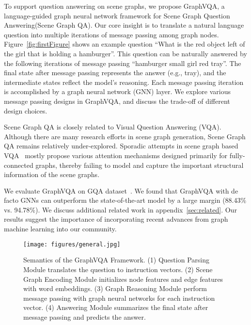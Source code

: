 \documentclass[11pt]{article}
\begin{document}
To support question answering on scene graphs, we propose GraphVQA, a language-guided graph neural network framework for Scene Graph Question Answering(Scene Graph QA). Our core insight is to translate a natural language question into multiple iterations of message passing among graph nodes. Figure~\ref{fig:firstFigure} shows an example question ``What is the red object left of the girl that is holding a hamburger''. 
This question can be naturally answered by the following iterations of message passing ``hamburger  small girl  red tray''. The final state after message passing represents the answer (e.g., tray), and the intermediate states reflect the model's reasoning. 
Each message passing iteration is accomplished by a graph neural network (GNN) layer. 
We explore various message passing designs in GraphVQA, and discuss the trade-off of different design choices. 



Scene Graph QA is closely related to Visual Question Answering (VQA). Although there are many research efforts in scene graph generation, Scene Graph QA remains relatively under-explored. Sporadic attempts in scene graph based VQA~\cite{LCGN,DBLP:conf/iccv/LiGCL19,DBLP:conf/nips/SantoroRBMPBL17} mostly propose various attention mechanisms designed primarily for fully-connected graphs, thereby failing to model and capture the important structural information of the scene graphs. 



We evaluate GraphVQA on GQA dataset~\cite{GQA}. 
We found that GraphVQA with de facto GNNs can outperform the state-of-the-art model by a large margin (88.43\% vs. 94.78\%). We discuss additional related work in appendix~\ref{sec:related}. 
Our results suggest the importance of incorporating recent advances from graph machine learning into our community. 
 
\begin{figure*}[t]
    \centering
    \texttt{[image: figures/general.jpg]}
    \caption{
    Semantics of the GraphVQA Framework. 
    (1) Question Parsing Module translates the question to  instruction vectors. 
    (2) Scene Graph Encoding Module initializes node features  and edge features  with word embeddings. 
    (3) Graph Reasoning Module perform message passing with graph neural networks for each instruction vector. 
    (4) Answering Module summarizes the final state after message passing and predicts the answer. 
}
\vspace{-6mm}
    \label{fig:general}
\end{figure*}
\end{document}
